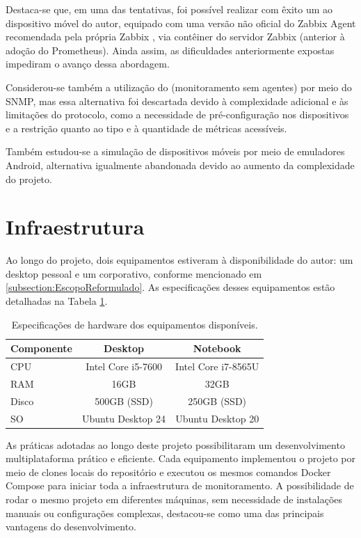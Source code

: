 Destaca-se que, em uma das tentativas, foi possível realizar com êxito um  ao dispositivo móvel do autor, equipado com uma versão não oficial do Zabbix Agent recomendada pela própria Zabbix \citep{unofficialzabbixagent2025}, via contêiner do servidor Zabbix (anterior à adoção do Prometheus). Ainda assim, as dificuldades anteriormente expostas impediram o avanço dessa abordagem.

Considerou-se também a utilização do  (monitoramento sem agentes) por meio do SNMP, mas essa alternativa foi descartada devido à complexidade adicional e às limitações do protocolo, como a necessidade de pré-configuração nos dispositivos e a restrição quanto ao tipo e à quantidade de métricas acessíveis.

Também estudou-se a simulação de dispositivos móveis por meio de emuladores Android, alternativa igualmente abandonada devido ao aumento da complexidade do projeto.


\section{Infraestrutura}
\label{section:Infraestrutura}

Ao longo do projeto, dois equipamentos estiveram à disponibilidade do autor: um desktop pessoal e um  corporativo, conforme mencionado em \ref{subsection:EscopoReformulado}. As especificações desses equipamentos estão detalhadas na Tabela \ref{tab:available-hardware}.

\begin{table}[htbp]
\centering
\caption{Especificações de hardware dos equipamentos disponíveis.}
\label{tab:available-hardware}
\begin{tabular}{lcc}
\toprule
\textbf{Componente} & \textbf{Desktop} & \textbf{Notebook} \\
\midrule
CPU   & Intel Core i5-7600   & Intel Core i7-8565U \\
RAM   & 16GB                 & 32GB                \\
Disco & 500GB (SSD)            & 250GB (SSD)          \\
SO & Ubuntu Desktop 24 & Ubuntu Desktop 20 \\
\bottomrule
\end{tabular}
\end{table}

As práticas adotadas ao longo deste projeto possibilitaram um desenvolvimento multiplataforma prático e eficiente. Cada equipamento implementou o projeto por meio de clones locais do repositório e executou os mesmos comandos Docker Compose para iniciar toda a infraestrutura de monitoramento. A possibilidade de rodar o mesmo projeto em diferentes máquinas, sem necessidade de instalações manuais ou configurações complexas, destacou-se como uma das principais vantagens do desenvolvimento.

